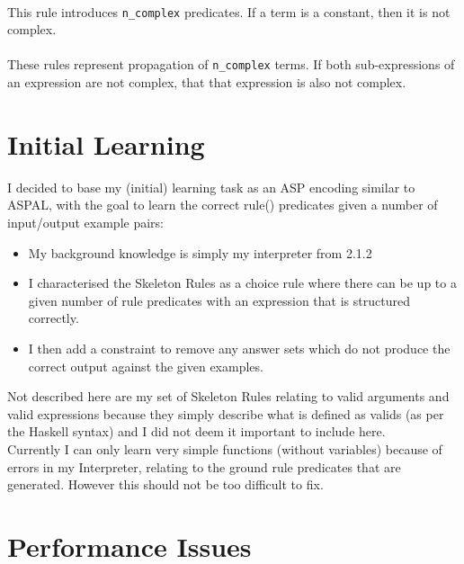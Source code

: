 
\mbox{} \\
This rule introduces \lstinline{n_complex} predicates. If a term is a constant, then it is not complex. \\ %


\mbox{} \\
These rules represent propagation of \lstinline{n_complex} terms. If both sub-expressions of an expression are not complex, that that expression is also not complex. \\ %

\section{Initial Learning}

I decided to base my (initial) learning task as an ASP encoding similar to ASPAL, with the goal to learn the correct rule() predicates given a number of input/output example pairs:

\begin{itemize}
\item My background knowledge is simply my interpreter from 2.1.2
\item I characterised the Skeleton Rules as a choice rule where there can be up to a given number of rule predicates with an expression that is structured correctly. 

\item I then add a constraint to remove any answer sets which do not produce the correct output against the given examples.

\end{itemize}

Not described here are my set of Skeleton Rules relating to valid arguments and valid expressions because they simply describe what is defined as valids (as per the Haskell syntax) and I did not deem it important to include here.\\

Currently I can only learn very simple functions (without variables) because of errors in my Interpreter, relating to the ground rule predicates that are generated. However this should not be too difficult to fix. 

\section{Performance Issues}
\pagebreak
%
%